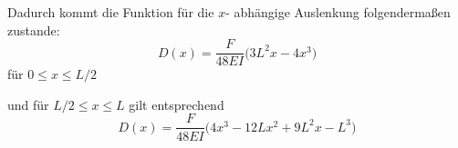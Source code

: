 Dadurch kommt die Funktion für die $x$- abhängige Auslenkung folgendermaßen zustande: \begin{equation}
   D(x) = \frac{F}{48EI} \bigl( 3L^2 x -4x^3 \bigr)
\end{equation} für $0 \leq x \leq L/2$

und für $L/2 \leq x \leq L$ gilt entsprechend \begin{equation}
    D(x) = \frac{F}{48EI} \bigl( 4x^3 - 12Lx^2 + 9L^2 x - L^3 \bigr)
\end{equation}

